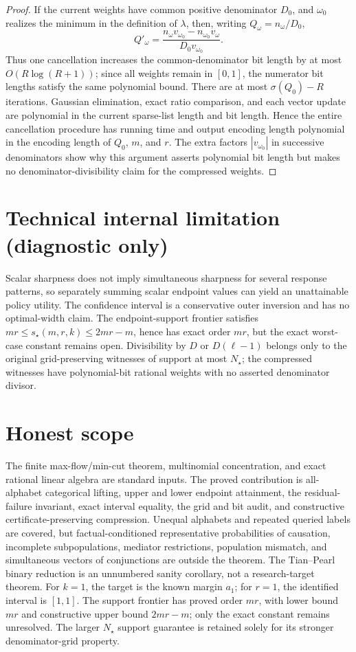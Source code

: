 \documentclass{article}
\begin{document}
\begin{proof}
If the current weights have common positive denominator \(D_0\), and \(\omega_0\) realizes the minimum in the definition of \(\lambda\), then, writing \(Q_{\omega}=n_\omega/D_0\),
\[
 Q'_\omega
 =\frac{n_\omega v_{\omega_0}-n_{\omega_0}v_\omega}
 {D_0v_{\omega_0}}.
\]
Thus one cancellation increases the common-denominator bit length by at most \(O(R\log(R+1))\); since all weights remain in \([0,1]\), the numerator bit lengths satisfy the same polynomial bound.  There are at most \(\sigma(Q_0)-R\) iterations.  Gaussian elimination, exact ratio comparison, and each vector update are polynomial in the current sparse-list length and bit length.  Hence the entire cancellation procedure has running time and output encoding length polynomial in the encoding length of \(Q_0\), \(m\), and \(r\).  The extra factors \(|v_{\omega_0}|\) in successive denominators show why this argument asserts polynomial bit length but makes no denominator-divisibility claim for the compressed weights.
\end{proof}

\section*{Technical internal limitation (diagnostic only)}

Scalar sharpness does not imply simultaneous sharpness for several response patterns, so separately summing scalar endpoint values can yield an unattainable policy utility.  The confidence interval is a conservative outer inversion and has no optimal-width claim.  The endpoint-support frontier satisfies \(mr\leq s_\star(m,r,k)\leq2mr-m\), hence has exact order \(mr\), but the exact worst-case constant remains open.  Divisibility by \(D\) or \(D(\ell-1)\) belongs only to the original grid-preserving witnesses of support at most \(N_\star\); the compressed witnesses have polynomial-bit rational weights with no asserted denominator divisor.

\section{Honest scope}

The finite max-flow/min-cut theorem, multinomial concentration, and exact rational linear algebra are standard inputs.  The proved contribution is all-alphabet categorical lifting, upper and lower endpoint attainment, the residual-failure invariant, exact interval equality, the grid and bit audit, and constructive certificate-preserving compression.  Unequal alphabets and repeated queried labels are covered, but factual-conditioned representative probabilities of causation, incomplete subpopulations, mediator restrictions, population mismatch, and simultaneous vectors of conjunctions are outside the theorem.  The Tian--Pearl binary reduction is an unnumbered sanity corollary, not a research-target theorem.  For \(k=1\), the target is the known margin \(a_1\); for \(r=1\), the identified interval is \([1,1]\).  The support frontier has proved order \(mr\), with lower bound \(mr\) and constructive upper bound \(2mr-m\); only the exact constant remains unresolved.  The larger \(N_\star\) support guarantee is retained solely for its stronger denominator-grid property.
\end{document}
